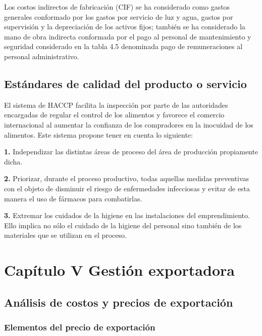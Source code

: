 \documentclass[
  stu,
  floatsintext,
  longtable,
  a4paper,
  nolmodern,
  notxfonts,
  notimes,
  colorlinks=true,linkcolor=blue,citecolor=blue,urlcolor=blue]{apa7}
\begin{document}
Los costos indirectos de fabricación (CIF) se ha considerado como gastos
generales conformado por los gastos por servicio de luz y agua, gastos
por supervisión y la depreciación de los activos fijos; también se ha
considerado la mano de obra indirecta conformada por el pago al personal
de mantenimiento y seguridad considerado en la tabla 4.5 denominada pago
de remuneraciones al personal administrativo.

\subsection{Estándares de calidad del producto o
servicio}\label{estuxe1ndares-de-calidad-del-producto-o-servicio}

El sistema de HACCP facilita la inspección por parte de las autoridades
encargadas de regular el control de los alimentos y favorece el comercio
internacional al aumentar la confianza de los compradores en la
inocuidad de los alimentos. Este sistema propone tener en cuenta lo
siguiente:

\textbf{1.} Independizar las distintas áreas de proceso del área de
producción propiamente dicha.

\textbf{2.} Priorizar, durante el proceso productivo, todas aquellas
medidas preventivas con el objeto de disminuir el riesgo de enfermedades
infecciosas y evitar de esta manera el uso de fármacos para combatirlas.

\textbf{3.} Extremar los cuidados de la higiene en las instalaciones del
emprendimiento. Ello implica no sólo el cuidado de la higiene del
personal sino también de los materiales que se utilizan en el proceso.

\section{Capítulo V Gestión
exportadora}\label{capuxedtulo-v-gestiuxf3n-exportadora}

\subsection{Análisis de costos y precios de
exportación}\label{anuxe1lisis-de-costos-y-precios-de-exportaciuxf3n}

\subsubsection{Elementos del precio de
exportación}\label{elementos-del-precio-de-exportaciuxf3n}
\end{document}
